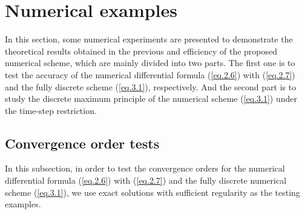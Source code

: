 \documentclass{siamart171218}
\numberwithin{theorem}{section}
\numberwithin{equation}{section}
\begin{document}
\section{Numerical examples}

In this section, some numerical experiments are presented to
demonstrate the theoretical results obtained in the previous and
efficiency of the proposed numerical scheme, which are
 mainly divided into two parts.
The first one
is to test the accuracy of the numerical differential formula
(\ref{eq.2.6}) with (\ref{eq.2.7}) and
the fully discrete scheme (\ref{eq.3.1}), respectively.
And
the second part is to study the discrete maximum
 principle of the numerical scheme
 (\ref{eq.3.1}) under the time-step
 restriction.

\subsection{Convergence order tests}

In this subsection, in order to test the  convergence orders for the numerical differential formula
(\ref{eq.2.6}) with (\ref{eq.2.7}) and
the fully discrete numerical scheme (\ref{eq.3.1}),
we use exact solutions with sufficient regularity as the testing examples.
\end{document}
